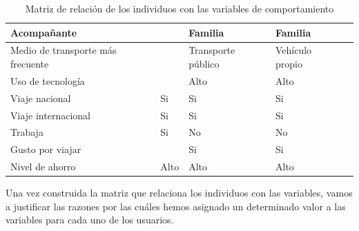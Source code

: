 \begin{table}[H]
\begin{tabular}{|p{10em}|p{7em}|p{7em}|p{7em}|p{8em}|}
        Acompañante                       &                                             & Familia                                       & Familia                                       \\ \hline
        Medio de transporte más frecuente &                                             & Transporte público                            & Vehículo propio                               \\ \hline
        Uso de tecnología                 &                                             & Alto                                          & Alto                                          \\ \hline
        Viaje nacional                    & Si                                          & Si                                            & Si                                            \\ \hline
        Viaje internacional               & Si                                          & Si                                            & Si                                            \\ \hline
        Trabaja                           & Si                                          & No                                            & No                                            \\ \hline
        Gusto por viajar                  &                                             & Si                                            & Si                                            \\ \hline
        Nivel de ahorro                   & Alto                                        & Alto                                          & Alto                                          \\ \hline
    \end{tabular}
    \caption{Matriz de relación de los individuos con las variables de comportamiento}
    \label{table:relacion-individuos-variables}
\end{table}

Una vez construida la matriz que relaciona los individuos con las variables, vamos a justificar las razones por las cuáles hemos asignado un
determinado valor a las variables para cada uno de los usuarios. \\

